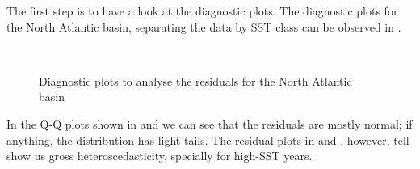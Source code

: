 \bigskip
The first step is to have a look at the diagnostic plots. The diagnostic plots for the North Atlantic basin, separating the data by SST class can be observed in .
\begin{figure}[H]
	\centering
	\\
	\caption{Diagnostic plots to analyse the residuals for the North Atlantic basin}
	\label{fig:natl_residuals}
\end{figure}
In the Q-Q plots shown in  and  we can see that the residuals are mostly normal; if anything, the distribution has light tails. The residual plots in  and , however, tell show us gross heteroscedasticity, specially for high-SST years.

